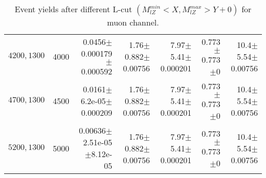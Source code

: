 \documentclass[]{article}
\begin{document}
\begin{table}
\begin{center}
{\begin{tabular}{ |r|r|r|r|r|r|r|}
$4200,1300$ & 4000 & 0.0456$\pm$0.000179$\pm$0.000592 & 1.76$\pm$0.882$\pm$0.00756 & 7.97$\pm$5.41$\pm$0.000201 & 0.773$\pm$0.773$\pm$0 & 10.4$\pm$5.54$\pm$0.00756 \\
$4700,1300$ & 4500 & 0.0161$\pm$6.2e-05$\pm$0.000209 & 1.76$\pm$0.882$\pm$0.00756 & 7.97$\pm$5.41$\pm$0.000201 & 0.773$\pm$0.773$\pm$0 & 10.4$\pm$5.54$\pm$0.00756 \\
$5200,1300$ & 5000 & 0.00636$\pm$2.51e-05$\pm$8.12e-05 & 1.76$\pm$0.882$\pm$0.00756 & 7.97$\pm$5.41$\pm$0.000201 & 0.773$\pm$0.773$\pm$0 & 10.4$\pm$5.54$\pm$0.00756 \\
\hline 
\end{tabular}
}
\end{center}
\caption{Event yields after different L-cut $(M_{lZ}^{min} < X, M_{lZ}^{max} > Y + 0)$ for muon channel.}
\end{table}
\end{document}
